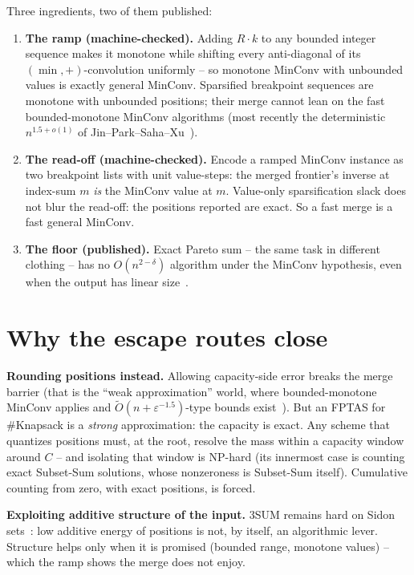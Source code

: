 \documentclass[11pt]{article}
\newcommand{\OO}{\widetilde{O}}
\begin{document}
Three ingredients, two of them published:

\begin{enumerate}
\item \textbf{The ramp (machine-checked).} Adding $R\cdot k$ to any
bounded integer sequence makes it monotone while shifting every
anti-diagonal of its $(\min,+)$-convolution uniformly -- so monotone
MinConv with unbounded values is exactly general MinConv. Sparsified
breakpoint sequences are monotone with unbounded positions; their
merge cannot lean on the fast bounded-monotone MinConv algorithms
(most recently the deterministic $n^{1.5+o(1)}$ of
Jin--Park--Saha--Xu~\cite{JPSX26}).
\item \textbf{The read-off (machine-checked).} Encode a ramped MinConv
instance as two breakpoint lists with unit value-steps: the merged
frontier's inverse at index-sum $m$ \emph{is} the MinConv value at
$m$. Value-only sparsification slack does not blur the read-off: the
positions reported are exact. So a fast merge is a fast general
MinConv.
\item \textbf{The floor (published).} Exact Pareto sum -- the same
task in different clothing -- has no $O(n^{2-\delta})$ algorithm under
the MinConv hypothesis, even when the output has linear
size~\cite{FHSST23}.
\end{enumerate}

\section{Why the escape routes close}

\textbf{Rounding positions instead.} Allowing capacity-side error
breaks the merge barrier (that is the ``weak approximation'' world,
where bounded-monotone MinConv applies and
$\OO(n+\varepsilon^{-1.5})$-type bounds exist~\cite{BC22,JPSX26}).
But an FPTAS for \#Knapsack is a \emph{strong} approximation: the
capacity is exact. Any scheme that quantizes positions must, at the
root, resolve the mass within a capacity window around $C$ -- and
isolating that window is NP-hard (its innermost case is counting
exact Subset-Sum solutions, whose nonzeroness is Subset-Sum itself).
Cumulative counting from zero, with exact positions, is forced.

\textbf{Exploiting additive structure of the input.} 3SUM remains
hard on Sidon sets~\cite{JX23}: low additive energy of positions is
not, by itself, an algorithmic lever. Structure helps only when it is
promised (bounded range, monotone values) -- which the ramp shows the
merge does not enjoy.
\end{document}
